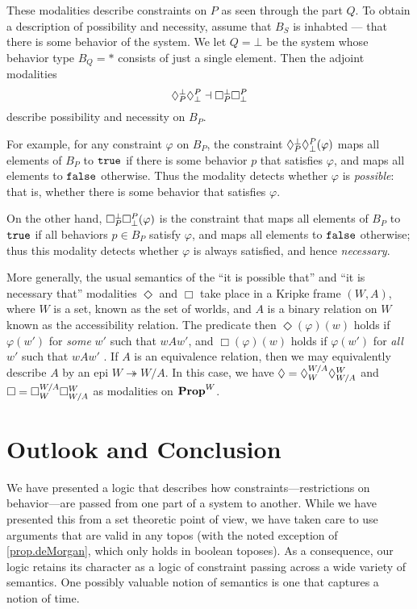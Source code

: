These modalities describe constraints on $P$ as seen through the part $Q$. To
obtain a description of possibility and necessity, assume that $B_S$ is inhabted
--- that there is some behavior of the system. We let $Q=\bot$ be the system whose behavior type $B_Q=\ast$ consists of just a single element. Then the adjoint modalities
$$\allows{\bot}{P}\allows{P}{\bot} \dashv \ensure{\bot}{P}\ensure{P}{\bot}$$
describe possibility and necessity on $B_P$. 

For example, for any constraint $\varphi$ on $B_P$, the constraint $\allows{\bot}{P}\allows{P}{\bot}(\varphi)$ maps all elements of $B_P$ to $\true$ if there is some behavior $p$ that satisfies $\varphi$, and maps all elements to $\false$ otherwise. Thus the modality detects whether $\varphi$ is \emph{possible}: that is, whether there is some behavior that satisfies $\varphi$. 

On the other hand, $\ensure{\bot}{P}\ensure{P}{\bot}(\varphi)$ is the constraint that maps all elements of $B_P$ to $\true$ if all behaviors $p \in B_P$ satisfy $\varphi$, and maps all elements to $\false$ otherwise; thus this modality detects whether $\varphi$ is always satisfied, and hence \emph{necessary}.

More generally, the usual semantics of the ``it is possible that'' and ``it is necessary that'' modalities $\Diamond$ and $\Box$ take place in a Kripke frame $(W,A)$, where $W$ is a set, known as the set of worlds, and $A$ is a binary relation on $W$ known as the accessibility relation. The predicate then $\Diamond(\varphi)(w)$ holds if $\varphi(w')$ for \emph{some} $w'$ such that $wAw'$, and $\Box(\varphi)(w)$ holds if $\varphi(w')$ for \emph{all} $w'$ such that $wAw'$ \cite{kripke1963semantical}. If $A$ is an equivalence relation, then we may equivalently describe $A$ by an epi $W \twoheadrightarrow W/A$. In this case, we have $\Diamond=\allows{W/A}{W}\allows{W}{W/A}$ and $\Box= \ensure{W/A}{W}\ensure{W}{W/A}$ as modalities on $\Prop^W$. 

\section{Outlook and Conclusion}
We have presented a logic that describes how constraints---restrictions on behavior---are passed from one part of a system to another. While we have presented this from a set theoretic point of view, we have taken care to use arguments that are valid in any topos (with the noted exception of \cref{prop.deMorgan}, which only holds in boolean toposes). As a consequence, our logic retains its character as a logic of constraint passing across a wide variety of semantics. One possibly valuable notion of semantics is one that captures a notion of time.

